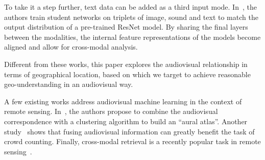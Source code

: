\documentclass[journal]{IEEEtran}
\begin{document}
To take it a step further, text data can be added as a third input mode. In~\cite{aytar_see_2017}, the authors train student networks on triplets of image, sound and text to match the output distribution of a pre-trained ResNet model. By sharing the final layers between the modalities, the internal feature representations of the models become aligned and allow for cross-modal analysis.

Different from these works, this paper explores the audiovisual relationship in terms of geographical location, based on which we target to achieve reasonable geo-understanding in an audiovisual way.  

A few existing works address audiovisual machine learning in
the context of remote sensing.
In~\cite{salem2018multimodal}, the authors propose to
combine the audiovisual correspondence with a clustering algorithm
to build an ``aural atlas''.
Another study~\cite{hu_ambient_2020} shows that
fusing audiovisual information can greatly benefit
the task of crowd counting.
Finally, cross-modal retrieval is a recently popular task in
remote sensing~\cite{mao_deep_2018,chen_deep_2020,chen_deep_2020-1}.
\end{document}
